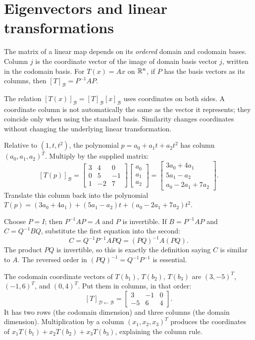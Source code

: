 \section{Eigenvectors and linear transformations}
The matrix of a linear map depends on its \emph{ordered} domain and codomain bases. Column $j$ is the coordinate vector of the image of domain basis vector $j$, written in the codomain basis. For $T(x)=Ax$ on $\mathbb{R}^n$, if $P$ has the basis vectors as its columns, then $[T]_{\mathcal B}=P^{-1}AP$.

The relation $[T(x)]_{\mathcal B}=[T]_{\mathcal B}[x]_{\mathcal B}$ uses coordinates on both sides. A coordinate column is not automatically the same as the vector it represents; they coincide only when using the standard basis. Similarity changes coordinates without changing the underlying linear transformation.

Relative to $(1,t,t^2)$, the polynomial $p=a_0+a_1t+a_2t^2$ has column $(a_0,a_1,a_2)^T$. Multiply by the supplied matrix:
\[
[T(p)]_{\mathcal B}=\begin{bmatrix}3&4&0\\0&5&-1\\1&-2&7\end{bmatrix}
\begin{bmatrix}a_0\\a_1\\a_2\end{bmatrix}
=\begin{bmatrix}3a_0+4a_1\\5a_1-a_2\\a_0-2a_1+7a_2\end{bmatrix}.
\]
Translate this column back into the polynomial
$T(p)=(3a_0+4a_1)+(5a_1-a_2)t+(a_0-2a_1+7a_2)t^2$.

 Choose $P=I$; then $P^{-1}AP=A$ and $P$ is invertible.
 If $B=P^{-1}AP$ and $C=Q^{-1}BQ$, substitute the first equation into the second:
\[
C=Q^{-1}P^{-1}APQ=(PQ)^{-1}A(PQ).
\]
The product $PQ$ is invertible, so this is exactly the definition saying $C$ is similar to $A$. The reversed order in $(PQ)^{-1}=Q^{-1}P^{-1}$ is essential.

The codomain coordinate vectors of $T(b_1)$, $T(b_2)$, $T(b_3)$ are $(3,-5)^T$, $(-1,6)^T$, and $(0,4)^T$. Put them in columns, in that order:
\[
[T]_{\mathcal D\leftarrow\mathcal B}
=\begin{bmatrix}3&-1&0\\-5&6&4\end{bmatrix}.
\]
It has two rows (the codomain dimension) and three columns (the domain dimension). Multiplication by a column $(x_1,x_2,x_3)^T$ produces the coordinates of $x_1T(b_1)+x_2T(b_2)+x_3T(b_3)$, explaining the column rule.

